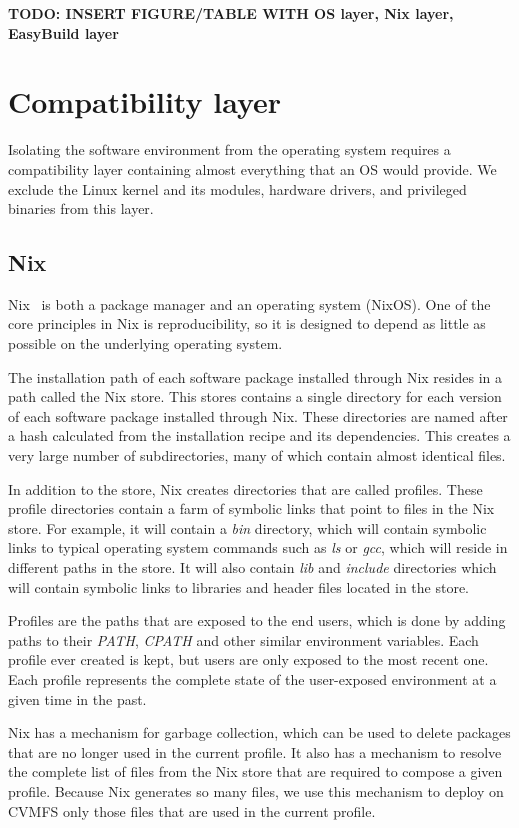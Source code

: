 \documentclass[sigconf]{acmart}
\begin{document}
\textbf{TODO: INSERT FIGURE/TABLE WITH OS layer, Nix layer, EasyBuild layer}
\label{tab:layers}


\section{Compatibility layer}
\label{sec:Compatibility_layer}
Isolating the software environment from the operating system requires a compatibility layer containing almost everything that an OS would provide. We exclude the Linux kernel and its modules, hardware drivers, and privileged binaries from this layer.

\subsection{Nix}
\label{sub:Nix}
Nix~\cite{Nix} is both a package manager and an operating system (NixOS). One of the core principles in Nix is reproducibility, so it is designed to depend as little as possible on the underlying operating system. 

The installation path of each software package installed through Nix resides in a path called the Nix store. This stores contains a single directory for each version of each software package installed through Nix. These directories are named after a hash calculated from the installation recipe and its dependencies. This creates a very large number of subdirectories, many of which contain almost identical files. 

In addition to the store, Nix creates directories that are called profiles. These profile directories contain a farm of symbolic links that point to files in the Nix store. For example, it will contain a {\it bin} directory, which will contain symbolic links to typical operating system commands such as {\it ls} or {\it gcc}, which will reside in different paths in the store. It will also contain {\it lib} and {\it include} directories which will contain symbolic links to libraries and header files located in the store. 

Profiles are the paths that are exposed to the end users, which is done by adding paths to their {\it PATH}, {\it CPATH} and other similar environment variables. Each profile ever created is kept, but users are only exposed to the most recent one. Each profile represents the complete state of the user-exposed environment at a given time in the past.

Nix has a mechanism for garbage collection, which can be used to delete packages that are no longer used in the current profile. It also has a mechanism to resolve the complete list of files from the Nix store that are required to compose a given profile. Because Nix generates so many files, we use this mechanism to deploy on CVMFS only those files that are used in the current profile. 
\end{document}
